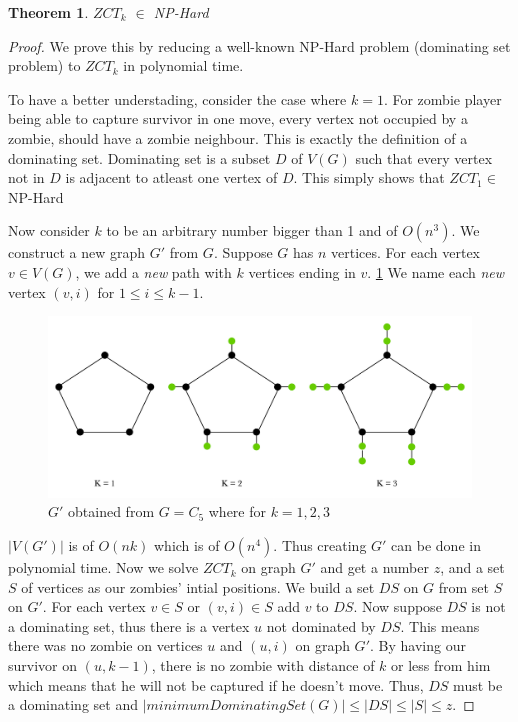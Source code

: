 \documentclass[1p]{elsarticle}
\newtheorem{theorem}{Theorem}
\begin{document}
	\begin{theorem}
		$ZCT_k$ $\in$ NP-Hard
	\end{theorem}
	\begin{proof}
		We prove this by reducing a well-known NP-Hard problem (dominating set problem) to $ZCT_k$ in polynomial time.

		To have a better understading, consider the case where $k=1$. For zombie player being able to capture survivor in
		one move, every vertex not occupied by a zombie, should have a zombie neighbour. This is exactly the definition
		of a dominating set. Dominating set is a subset $D$ of $V(G)$ such that every vertex not in $D$ is adjacent to
		atleast one vertex of $D$. This simply shows that $ZCT_1 \in$ NP-Hard 

		Now consider $k$ to be an arbitrary number bigger than 1 and of $O(n^3)$. We construct a new graph $G'$ from
		$G$. Suppose $G$ has $n$ vertices. For each vertex $v \in V(G)$, we add a {\it new} path with $k$ vertices
		ending in $v$. \ref{fig:p7} We name each {\it new} vertex $(v,i)$ for $1 \leq i \leq k - 1$.
		
		\begin{figure}[h!]
			\centering
			\includegraphics[width=0.9\linewidth]{fig/ZCT.png}
			\caption{$G'$ obtained from $G = C_5$ where for $k = 1,2,3$}
			\label{fig:p7}
		\end{figure}		


		$|V(G')|$ is of $O(nk)$ which is of $O(n^4)$. Thus creating $G'$ can be done in polynomial time. Now we solve
		$ZCT_k$ on graph $G'$ and get a number $z$, and a set $S$ of vertices as our zombies' intial positions. We build
		a set $DS$ on $G$ from set $S$ on $G'$. For each vertex $v \in S$ or $(v,i) \in S$ add $v$ to $DS$. Now suppose
		$DS$ is not a dominating set, thus there is a vertex $u$ not dominated by $DS$. This means there was no zombie
		on vertices $u$ and $(u,i)$ on graph $G'$. By having our survivor on $(u,k-1)$, there is no zombie with distance
		of $k$ or less from him which means that he will not be captured if he doesn't move. Thus, $DS$ must be a
		dominating set and $ |minimumDominatingSet(G)| \leq |DS| \leq |S| \leq z$.


\end{proof}
\end{document}
